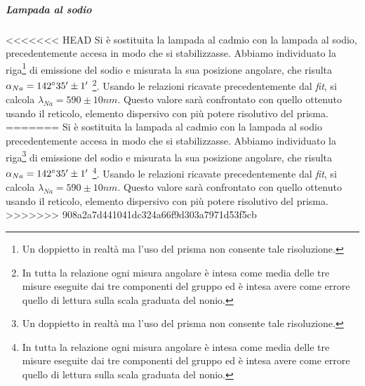\documentclass[10pt,a4paper]{article}
\begin{document}
\begin{table}[!htb]
\subparagraph{Lampada al sodio}
<<<<<<< HEAD
Si è sostituita la lampada al cadmio con la lampada al sodio, precedentemente accesa in modo che si stabilizzasse. Abbiamo individuato la riga\footnote{Un doppietto in realtà ma l'uso del prisma non consente tale risoluzione.} di emissione del sodio e misurata la sua posizione angolare, che risulta $\alpha_{Na}=142 \degree 35'\pm 1'$ \footnote{In tutta la relazione ogni misura angolare è intesa come media delle tre misure eseguite dai tre componenti del gruppo ed è intesa avere come errore quello di lettura sulla scala graduata del nonio.}. Usando le relazioni ricavate precedentemente dal \emph{fit}, si calcola $\lambda_{Na}=590 \pm 10 nm$. Questo valore sarà confrontato con quello ottenuto usando il reticolo, elemento dispersivo con più potere risolutivo del prisma.
=======
Si è sostituita la lampada al cadmio con la lampada al sodio precedentemente accesa in modo che si stabilizzasse. Abbiamo individuato la riga\footnote{Un doppietto in realtà ma l'uso del prisma non consente tale risoluzione.} di emissione del sodio e misurata la sua posizione angolare, che risulta $\alpha_{Na}=142 \degree 35'\pm 1'$ \footnote{In tutta la relazione ogni misura angolare è intesa come media delle tre misure eseguite dai tre componenti del gruppo ed è intesa avere come errore quello di lettura sulla scala graduata del nonio.}. Usando le relazioni ricavate precedentemente dal \emph{fit}, si calcola $\lambda_{Na}=590 \pm 10 nm$. Questo valore sarà confrontato con quello ottenuto usando il reticolo, elemento dispersivo con più potere risolutivo del prisma.
>>>>>>> 908a2a7d441041dc324a66f9d303a7971d53f5cb


\end{table}
\end{document}
